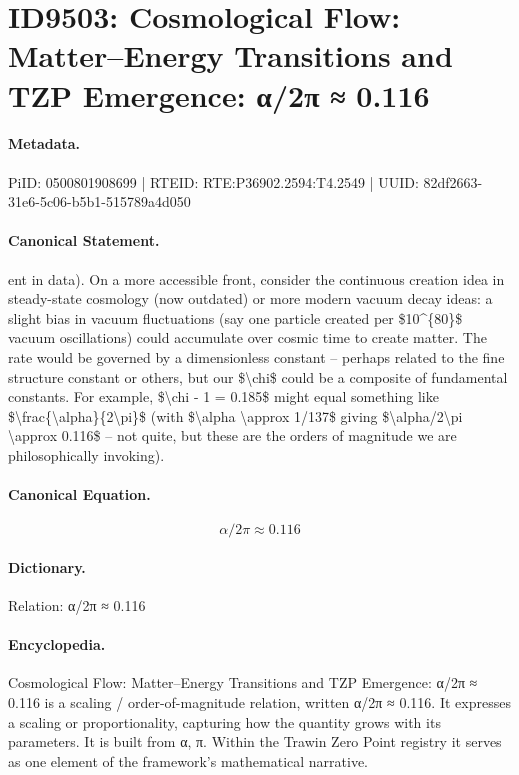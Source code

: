 \section*{ID9503: Cosmological Flow: Matter–Energy Transitions and TZP Emergence: α/2π ≈ 0.116}
\paragraph{Metadata.}
PiID: 0500801908699 | RTEID: RTE:P36902.2594:T4.2549 | UUID: 82df2663-31e6-5c06-b5b1-515789a4d050

\paragraph{Canonical Statement.}
ent in data). On a more accessible front, consider the continuous creation idea in steady-state cosmology (now outdated) or more modern vacuum decay ideas: a slight bias in vacuum fluctuations (say one particle created per \$10\textasciicircum{}\{80\}\$ vacuum oscillations) could accumulate over cosmic time to create matter. The rate would be governed by a dimensionless constant – perhaps related to the fine structure constant or others, but our \$\textbackslash{}chi\$ could be a composite of fundamental constants. For example, \$\textbackslash{}chi - 1 = 0.185\$ might equal something like \$\textbackslash{}frac\{\textbackslash{}alpha\}\{2\textbackslash{}pi\}\$ (with \$\textbackslash{}alpha \textbackslash{}approx 1/137\$ giving \$\textbackslash{}alpha/2\textbackslash{}pi \textbackslash{}approx 0.116\$ – not quite, but these are the orders of magnitude we are philosophically invoking).

\paragraph{Canonical Equation.}
\[
\alpha/2\pi \approx 0.116
\]

\paragraph{Dictionary.}
Relation: α/2π ≈ 0.116

\paragraph{Encyclopedia.}
Cosmological Flow: Matter–Energy Transitions and TZP Emergence: α/2π ≈ 0.116 is a scaling / order-of-magnitude relation, written α/2π ≈ 0.116. It expresses a scaling or proportionality, capturing how the quantity grows with its parameters. It is built from α, π. Within the Trawin Zero Point registry it serves as one element of the framework's mathematical narrative.
